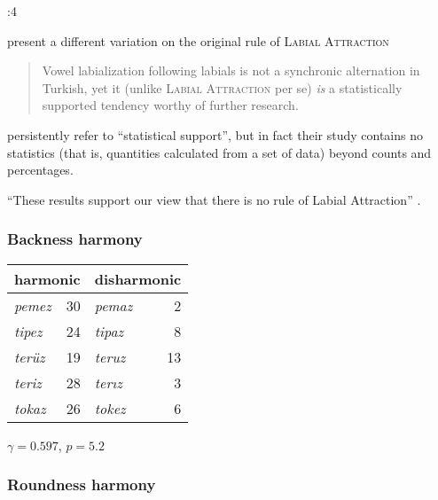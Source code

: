 \citet{Zuraw2000}:4

\citet{Inkelas2001} present a different variation on the original rule of \textsc{Labial Attraction}


\begin{quote}
Vowel labialization following labials is not a synchronic alternation in Turkish, yet it (unlike \textsc{Labial Attraction} per se) \emph{is} a statistically supported tendency worthy of further research. \citep[][196, emphasis in original]{Inkelas2001}
\end{quote}

\noindent \citeauthor{Inkelas2001} persistently refer to ``statistical support'', but in fact their study contains no statistics (that is, quantities calculated from a set of data) beyond counts and percentages. 



``These results support our view that there is no rule of Labial Attraction'' \citep[][225]{Clements1982}.


\citet{Goodman1954}


\subsubsection{Backness harmony}


\begin{example}
\begin{tabular}{l r l r}
\toprule
\multicolumn{2}{l}{harmonic} & \multicolumn{2}{l}{disharmonic} \\
\midrule
\emph{pemez} & 30            & \emph{pemaz} & 2  \\
\emph{tipez} & 24            & \emph{tipaz} & 8  \\ 
\emph{terüz} & 19            & \emph{teruz} & 13 \\ %
\emph{teriz} & 28            & \emph{terız} & 3  \\
\emph{tokaz} & 26            & \emph{tokez} & 6  \\ %
\bottomrule
\end{tabular}
\end{example}

$\gamma = 0.597$, $p = 5.2$

\subsubsection{Roundness harmony}

